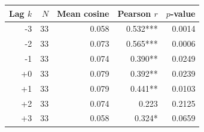 \begin{tabular}{rrrrr}
\toprule
Lag $k$ & $N$ & Mean cosine & Pearson $r$ & $p$-value \\
\midrule
-3 & 33 & 0.058 & 0.532*** & 0.0014 \\
-2 & 33 & 0.073 & 0.565*** & 0.0006 \\
-1 & 33 & 0.074 & 0.390** & 0.0249 \\
+0 & 33 & 0.079 & 0.392** & 0.0239 \\
+1 & 33 & 0.079 & 0.441** & 0.0103 \\
+2 & 33 & 0.074 & 0.223 & 0.2125 \\
+3 & 33 & 0.058 & 0.324* & 0.0659 \\
\bottomrule
\end{tabular}